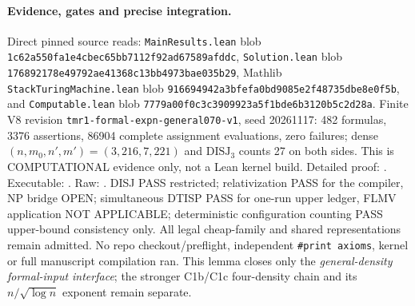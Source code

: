 \documentclass[11pt]{article}
\begin{document}
\paragraph{Evidence, gates and precise integration.}
Direct pinned source reads: \texttt{MainResults.lean}
blob \texttt{1c62a550fa1e4cbec65bb7112f92ad67589afddc},
\texttt{Solution.lean} blob
\texttt{176892178e49792ae41368c13bb4973bae035b29},
Mathlib \texttt{StackTuringMachine.lean} blob
\texttt{916694942a3bfefa0bd9085e2f48735dbe8e0f5b},
and \texttt{Computable.lean} blob
\texttt{7779a00f0c3c3909923a5f1bde6b3120b5c2d28a}.
Finite V8 revision \texttt{tmr1-formal-expn-general070-v1},
seed 20261117: 482 formulas, 3376 assertions, 86904 complete
assignment evaluations, zero failures; dense
$(n,m_0,n',m')=(3,216,7,221)$ and
$\mathrm{DISJ}_3$ counts 27 on both sides.
This is COMPUTATIONAL evidence only, not a Lean kernel build.
Detailed proof:
.
Executable:
.
Raw:
.
DISJ PASS restricted; relativization PASS for the compiler,
NP bridge OPEN; simultaneous DTISP PASS for one-run upper ledger,
FLMV application NOT APPLICABLE; deterministic configuration counting
PASS upper-bound consistency only. All legal cheap-family and shared
representations remain admitted. No repo checkout/preflight,
independent \texttt{\#print axioms}, kernel or full manuscript
compilation ran. This lemma closes only the \emph{general-density
formal-input interface}; the stronger C1b/C1c four-density chain and
its $n/\sqrt{\log n}$ exponent remain separate.
\end{document}
